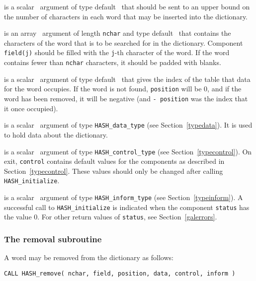 \documentclass{galahad}
\newcommand{\packagename}{HASH}
\begin{document}
\vspace*{-2mm}
\begin{description}

 is a scalar \intentin\ argument of type default \integer\ that
should be sent to an upper bound on the number of characters in each
word that may be inserted into the dictionary.

 is an array \intentin\ argument of length {\tt nchar} and
type default \character\ that contains the characters of the word that
is to be searched for in the dictionary.
Component {\tt field(j)} should be filled with the {\tt j}-th
character of the word. If the word contains fewer than {\tt nchar} characters,
it should be padded with blanks.

 is a scalar \intentout\ argument of type default \integer\ that
gives the index of the table that data for the word occupies. If the word is
not found, {\tt position} will be 0, and if the word has been removed, it will
be negative (and {\tt - position} was the index that it once occupied).

 is a scalar \intentinout\ argument of type
{\tt \packagename\_data\_type}
(see Section~\ref{typedata}). It is used to hold data about the dictionary.

 is a scalar \intentin\ argument of type
{\tt \packagename\_control\_type}
(see Section~\ref{typecontrol}).
On exit, {\tt control} contains default values for the components as
described in Section~\ref{typecontrol}.
These values should only be changed after calling
{\tt \packagename\_initialize}.

 is a scalar \intentinout\ argument of type
{\tt \packagename\_inform\_type}
(see Section~\ref{typeinform}). A successful call to
{\tt \packagename\_initialize}
is indicated when the  component {\tt status} has the value 0.
For other return values of {\tt status}, see Section~\ref{galerrors}.

\end{description}


\subsubsection{The removal subroutine}\label{subremove}
A word may be removed from the dictionary as follows:
\vspace*{1mm}

\hspace{8mm}
{\tt CALL \packagename\_remove( nchar, field, position, data, control, inform )}
\end{document}
